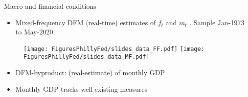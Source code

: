 \documentclass[xcolor=dvipsnames, xcolor=table, 10pt]{beamer}
\begin{document}
\begin{frame}{Macro and financial conditions}
\label{main:data}
\begin{itemize}
    \item Mixed-frequency DFM (real-time) estimates of \textbf{$f_t$} and \textbf{$m_t$} \citep{AruobaDieboldScotti2009}. Sample  Jan-1973 to May-2020.
\end{itemize}

\begin{figure}
     {\texttt{[image: FiguresPhillyFed/slides\_data\_FF.pdf]}}\hspace*{-0.1in}
     {\texttt{[image: FiguresPhillyFed/slides\_data\_MF.pdf]}}
\end{figure}

\begin{itemize}
\item DFM-byproduct: (real-estimate) of monthly GDP
\medskip
\item Monthly GDP tracks well existing measures \citep{stock1989new,lewis2020us} \hyperlink{app:mgdp}{}
\end{itemize}


\end{frame}

\end{document}
